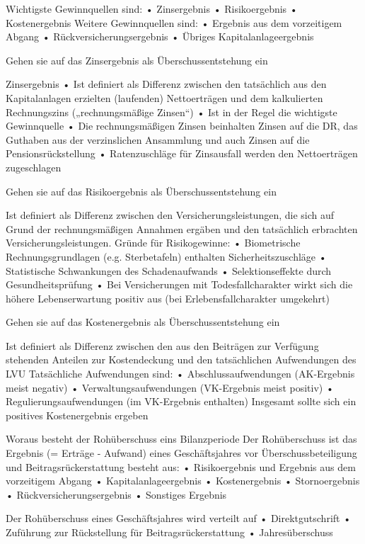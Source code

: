 Wichtigste Gewinnquellen sind:
• Zinsergebnis
• Risikoergebnis
• Kostenergebnis
Weitere Gewinnquellen sind:
• Ergebnis aus dem vorzeitigem Abgang
• Rückversicherungsergebnis
• Übriges Kapitalanlageergebnis


Gehen sie auf das Zinsergebnis als Überschussentstehung ein

Zinsergebnis
• Ist definiert als Differenz zwischen den tatsächlich aus den Kapitalanlagen erzielten (laufenden) Nettoerträgen und dem
kalkulierten Rechnungszins („rechnungsmäßige Zinsen“)
• Ist in der Regel die wichtigste Gewinnquelle
• Die rechnungsmäßigen Zinsen beinhalten Zinsen auf die DR, das Guthaben aus der verzinslichen Ansammlung und auch
Zinsen auf die Pensionsrückstellung
• Ratenzuschläge für Zinsausfall werden den Nettoerträgen zugeschlagen



Gehen sie auf das Risikoergebnis als Überschussentstehung ein

Ist definiert als Differenz zwischen den Versicherungsleistungen, die sich auf Grund der rechnungsmäßigen Annahmen ergäben
und den tatsächlich erbrachten Versicherungsleistungen.
Gründe für Risikogewinne:
• Biometrische Rechnungsgrundlagen (e.g. Sterbetafeln) enthalten Sicherheitszuschläge
• Statistische Schwankungen des Schadenaufwands
• Selektionseffekte durch Gesundheitsprüfung
• Bei Versicherungen mit Todesfallcharakter wirkt sich die höhere Lebenserwartung positiv aus
(bei Erlebensfallcharakter umgekehrt)


Gehen sie auf das Kostenergebnis als Überschussentstehung ein

Ist definiert als Differenz zwischen den aus den Beiträgen zur Verfügung stehenden Anteilen zur Kostendeckung und den
tatsächlichen Aufwendungen des LVU
Tatsächliche Aufwendungen sind:
• Abschlussaufwendungen (AK-Ergebnis meist negativ)
• Verwaltungsaufwendungen (VK-Ergebnis meist positiv)
• Regulierungsaufwendungen (im VK-Ergebnis enthalten)
Insgesamt sollte sich ein positives Kostenergebnis ergeben


Woraus besteht der Rohüberschuss eins Bilanzperiode
Der Rohüberschuss ist das Ergebnis (= Erträge - Aufwand) eines Geschäftsjahres vor Überschussbeteiligung und Beitragsrückerstattung
besteht aus:
• Risikoergebnis und Ergebnis aus dem vorzeitigem Abgang
• Kapitalanlageergebnis
• Kostenergebnis
• Stornoergebnis
• Rückversicherungsergebnis
• Sonstiges Ergebnis

Der Rohüberschuss eines Geschäftsjahres wird verteilt auf
• Direktgutschrift
• Zuführung zur Rückstellung für Beitragsrückerstattung
• Jahresüberschuss

